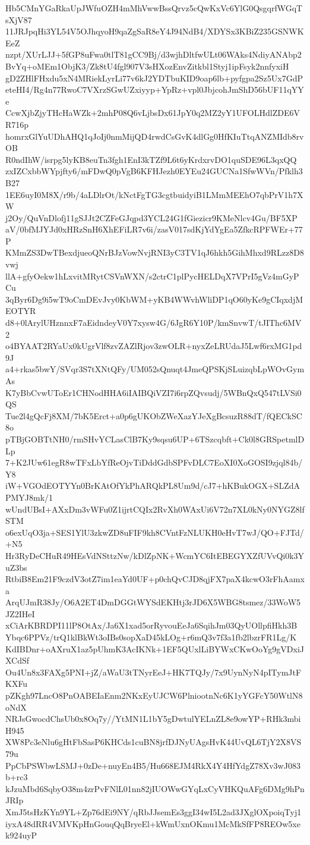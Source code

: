 Hb5CMnYGaRkaUpJWfuOZH4mMhVwwBssQrvz5cQwKxVc6YlG0QsgqrfWGqTsXjV87
11JRJpqHi3YL54V5OJhqyoH9qaZgSaR8eY4J94NdB4/XDYSx3KBiZ235GSNWKEeZ
nzpt/XUrLJJ+5fGP8uFwa0tlT81gCC9Bj/d3wjhDltfwULt06WAks4NdiyANAbp2
BvYq+oMEm1ObjK3/Zk8tU4fgl907V3sHXozEnvZitkbl1Styj1ipFsyk2nnfyxiH
gD2ZHlFHxdu5xN4MRiekLyrLi77v6kJ2YDTbuKID9oap6lb+pyfgpa2Sz5Ux7GdP
eteHI4/Rg4n77RwoC7VXrzSGwUZxiyyp+YpRz+vpl0JbjcohJmShD56bUF11qYYe
CcwXjbZjyTHcHaWZk+2mhP08Q6vLjbsDx61JpY0q2MZ2yY1UFOLHdlZDE6VR716p
homrxGlYuUDhAHQ1qJoIj0nmMijQD4rwdCsGvK4dlGg0HfKIuTtqANZMIdb8rvOB
R0ndIhW/isrpg5lyKB8euTn3fgh1EnI3kTZf9L6t6yKrdxrvDO1quSDE96L3qxQQ
zxIZCxbbWYpjfty6/mFDwQ0pVgB6KFHJezh0EYEu24GUCNa1SfwWVn/Pfklh3B27
1EE6uyI0M8X/r9b/4aLDlrOt/kNctFgTG3cgtbuidyiB1LMmMEEhO7qbPrV1h7XW
j2Oy/QuVnDlofj11gSJJt2CZFeGJqpd3YCL24G1fGiezicr9KMeNlcv4Gu/BF5XP
aV/0bfMJYJd0xHRzSnH6XhEFiLR7v6i/zasV017sdKjYdYgEa5ZfkcRPFWEr+77P
KMmZS3DwTBexdjueoQNrBJzVowNvjRNI3yC3TV1qJ6hkh5GihMhxd9RLzz8D8vwj
llA+gfyOekw1hLxvitMRytCSVnWXN/s2ctrC1plPycHELDqX7VPrI5gVz4mGyPCu
3qByr6Dg9i5wT9oCmDEvJvy0KbWM+yKB4WWvhWliDP1qO60yKe9gCIqxdjMEOTYR
d8+0lArylUHznnxF7aEidndeyV0Y7xysw4G/6JgR6Y10P/kmSnvwT/tJIThc6MV2
o4BYAAT2RYaUx0kUgrVlf8zvZAZlRjov3zwOLR+nyxZeLRUdaJ5Lwf6rxMG1pd9J
a4+rkas5bwY/SVqr3S7tXNtQFy/UM052sQnuqt4JmeQPSKjSLuizqbLpWOvGymAs
K7yBbCvwUToEr1CHNodHHA6iIAIBQiVZI7i6rpZQvsudj/5WBnQxQ547tLVSi0QS
Tue2l4gQcFj8XM/7bK5Erct+a0p6gUKObZWeXazYJeXgBcsuzR88dT/fQECkSC8o
pTBjGOBTtNH0/rmSHvYCLasClB7Ky9sqsu6UP+6TSzcqbft+Ck0l8GRSpetmlDLp
7+K2JUw61egR8wTFxLbYfReOjvTiDddGdbSPFvDLC7EoXI0XoGOSI9zjql84b/Y8
iW+VGOdEOTYYn0BrKAtOfYkPhARQkPL8Um9d/cJ7+hKBukOGX+SLZdAPMYJ8mk/1
wUndUBsI+AXxDm3vWFu0Z1ijrtCQIx2RvXh0WAxUi6V72n7XL0kNy0NYGZ8lfSTM
o6exUqO3ja+SES1YlU3zkwZD8uFIF9kh8CVntFzNLUKH0eHvT7wJ/QO+FJTd/+N5
Hr3RyDeCHuR49HEsVdNSttzNw/kDlZpNK+WcmYC6ItEBEGYXZfUVvQi0k3YuZ3bs
RtbiB8Em21F9czdV3otZ7im1eaYd0UF+p0chQvCJD8qjFX7paX4kcwO3rFhAamxa
ArqUJmR38Jy/O6A2ET4DmDGGtWYSdEKHtj3rJD6X5WBG8tsmez/33WoW5JZ2IHeI
xCiArKBRDPI11lP8OtAx/Ja6X1xad5orRyvouEeJa6SqihJm03QyUOllpfiHkh3B
Ybqc6PPVz/trQ1klBkWt3oIBs0sopXaD45kLOg+r6mQ3v7f3a1fb2lbzrFR1Lg/K
KdIBDnr+oAXruX1az5pUhmK3AcIKNk+1EF5QUxlLiBYWxCKwOoYg9gVDxiJXCdSf
Ou4Un8x3FAXg5PNI+jZ/aWaU3tTNyrEeJ+HK7TQJy/7x9UynNyN4pITymJtFKXFu
pZKgh97LncO8PnOABEIaEnm2NKxEyUJCW6PlniootnNc6K1yYGFcY50WtlN8oNdX
NRJsGwocdChsUb0x8Oq7y//YtMN1L1bY5gDwtulYELnZL8e9owYP+RHk3mbiH945
XW8Pc3eNlu6gHtFbSasP6KHCds1cuBN8jrfDJNyUAgsHvK44UvQL6TjY2X8VS79u
PpCbPSWbwLSMJ+0zDe+nuyEn4B5/Hu668EJM4RkX4Y4HfYdgZ78Xv3wJ083b+rc3
kJzuMbd6SqbyO38m4zrPvFNlL01nn82jIUOWwGYqLxCyVHKQuAFg6DMg9hPnJRIp
XmJ5tsHzKYn9YL+Zp76dEi9NY/qRbJJsemEs3ggI34wI5L2ad3JXglOXpoiqTyj1
iyxA48dRR4VMVKpHnGouqQqBryeEl+kWmUxnOKmu1McMkSfFP8REOw5xek924uyP
